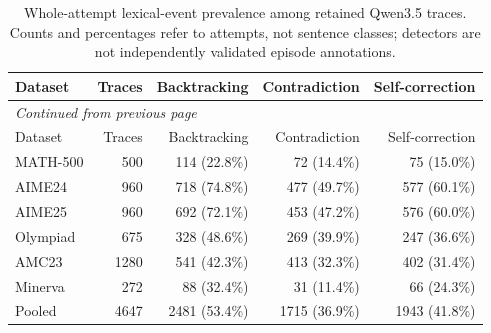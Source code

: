 \begingroup\scriptsize\setlength{\tabcolsep}{4pt}
\begin{longtable}{@{}lrrrr@{}}
\caption{Whole-attempt lexical-event prevalence among retained Qwen3.5 traces. Counts and percentages refer to attempts, not sentence classes; detectors are not independently validated episode annotations.}\label{tab:qwen-corr-events}\\
\toprule
Dataset & Traces & Backtracking & Contradiction & Self-correction \\
\midrule\endfirsthead
\multicolumn{5}{l}{\textit{Continued from previous page}}\\
\toprule
Dataset & Traces & Backtracking & Contradiction & Self-correction \\
\midrule\endhead
\bottomrule\endfoot
MATH-500 & 500 & 114 (22.8\%) & 72 (14.4\%) & 75 (15.0\%) \\
AIME24 & 960 & 718 (74.8\%) & 477 (49.7\%) & 577 (60.1\%) \\
AIME25 & 960 & 692 (72.1\%) & 453 (47.2\%) & 576 (60.0\%) \\
Olympiad & 675 & 328 (48.6\%) & 269 (39.9\%) & 247 (36.6\%) \\
AMC23 & 1280 & 541 (42.3\%) & 413 (32.3\%) & 402 (31.4\%) \\
Minerva & 272 & 88 (32.4\%) & 31 (11.4\%) & 66 (24.3\%) \\
Pooled & 4647 & 2481 (53.4\%) & 1715 (36.9\%) & 1943 (41.8\%) \\
\end{longtable}\endgroup

